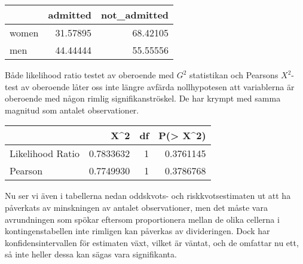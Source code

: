 \documentclass[]{article}
\newenvironment{Shaded}{\begin{snugshade}}{\end{snugshade}}
\newcommand{\KeywordTok}[1]{\textcolor[rgb]{0.13,0.29,0.53}{\textbf{#1}}}
\newcommand{\NormalTok}[1]{#1}
\newcommand{\OperatorTok}[1]{\textcolor[rgb]{0.81,0.36,0.00}{\textbf{#1}}}
\newcommand{\StringTok}[1]{\textcolor[rgb]{0.31,0.60,0.02}{#1}}
\begin{document}
\begin{Shaded}
\end{Shaded}

\begin{longtable}[]{@{}lrr@{}}
\toprule
& admitted & not\_admitted\tabularnewline
\midrule
\endhead
women & 31.57895 & 68.42105\tabularnewline
men & 44.44444 & 55.55556\tabularnewline
\bottomrule
\end{longtable}

Både likelihood ratio testet av oberoende med \(G^{2}\) statistikan och
Pearsons \(X^{2}\)-test av oberoende låter oss inte längre avfärda
nollhypotesen att variablerna är oberoende med någon rimlig
signifikanströskel. De har krympt med samma magnitud som antalet
observationer.

\begin{Shaded}
\end{Shaded}

\begin{longtable}[]{@{}lrrr@{}}
\toprule
& X\^{}2 & df & P(\textgreater{} X\^{}2)\tabularnewline
\midrule
\endhead
Likelihood Ratio & 0.7833632 & 1 & 0.3761145\tabularnewline
Pearson & 0.7749930 & 1 & 0.3786768\tabularnewline
\bottomrule
\end{longtable}

Nu ser vi även i tabellerna nedan oddskvots- och riskkvotsestimaten ut
att ha påverkats av minskningen av antalet observationer, men det måste
vara avrundningen som spökar eftersom proportionera mellan de olika
cellerna i kontingenstabellen inte rimligen kan påverkas av
divideringen. Dock har konfidensintervallen för estimaten växt, vilket
är väntat, och de omfattar nu ett, så inte heller dessa kan sägas vara
signifikanta.

\begin{Shaded}
\end{Shaded}
\end{document}
